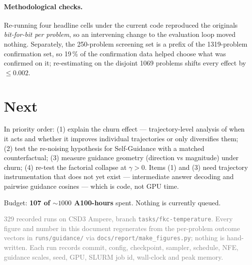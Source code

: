 \documentclass[11pt,a4paper]{article}
\begin{document}
\paragraph{Methodological checks.} Re-running four headline cells under the current code reproduced the originals \emph{bit-for-bit per problem}, so an intervening change to the evaluation loop moved nothing. Separately, the 250-problem screening set is a prefix of the 1319-problem confirmation set, so 19\,\% of the confirmation data helped choose what was confirmed on it; re-estimating on the disjoint 1069 problems shifts every effect by $\le0.002$.

\section{Next}
In priority order: (1) explain the churn effect --- trajectory-level analysis of when it acts and whether it improves individual trajectories or only diversifies them; (2) test the re-noising hypothesis for Self-Guidance with a matched counterfactual; (3) measure guidance geometry (direction vs magnitude) under churn; (4) re-test the factorial collapse at $\gamma>0$. Items (1) and (3) need trajectory instrumentation that does not yet exist --- intermediate answer decoding and pairwise guidance cosines --- which is code, not GPU time.

Budget: \textbf{107 of ${\sim}1000$ A100-hours} spent. Nothing is currently queued.

\vfill{\footnotesize\textcolor{Grey}{329 recorded runs on CSD3 Ampere, branch \texttt{tasks/fkc-temperature}. Every figure and number in this document regenerates from the per-problem outcome vectors in \texttt{runs/guidance/} via \texttt{docs/report/make\_figures.py}; nothing is hand-written. Each run records commit, config, checkpoint, sampler, schedule, NFE, guidance scales, seed, GPU, SLURM job id, wall-clock and peak memory.}}
\end{document}
